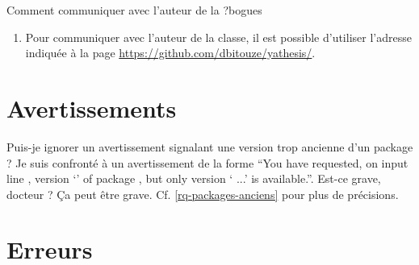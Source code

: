\begin{dbfaq}{Comment communiquer avec l'auteur de la \yatCl{} ?}{bogues}
\begin{enumerate}
  \item Pour communiquer avec l'auteur de la classe, il est possible d'utiliser
    l'adresse indiquée à la page \url{https://github.com/dbitouze/yathesis/}.
  \end{enumerate}
\end{dbfaq}

\section{Avertissements}
\label{sec-avertissements}

\begin{dbfaq}{Puis-je ignorer un avertissement signalant une version trop
    ancienne d'un package ?}{}
  Je suis confronté à un avertissement de la forme \enquote{You have requested,
    on input line , version `' of package
    , but only version ` ...'
    is available.}. Est-ce grave, docteur ?
  \tcblower
  Ça peut être grave. Cf. \vref{rq-packages-anciens} pour plus de précisions.
\end{dbfaq}

\section{Erreurs}
\label{sec-erreurs}%
%
%

